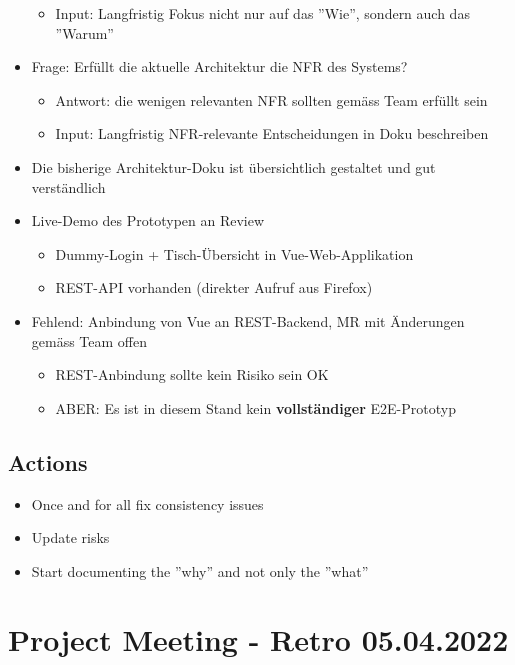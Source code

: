 \begin{itemize}
\begin{itemize}
        \item Input: Langfristig Fokus nicht nur auf das ''Wie'', sondern auch das ''Warum''
    \end{itemize}
    \item Frage: Erfüllt die aktuelle Architektur die NFR des Systems?
    \begin{itemize}
        \item Antwort: die wenigen relevanten NFR sollten gemäss Team erfüllt sein
        \item Input: Langfristig NFR-relevante Entscheidungen in Doku beschreiben
    \end{itemize}
    \item Die bisherige Architektur-Doku ist übersichtlich gestaltet und gut verständlich
    \item Live-Demo des Prototypen an Review
    \begin{itemize}
        \item Dummy-Login + Tisch-Übersicht in Vue-Web-Applikation
        \item REST-API vorhanden (direkter Aufruf aus Firefox)
    \end{itemize}
    \item Fehlend: Anbindung von Vue an REST-Backend, MR mit Änderungen gemäss Team offen
    \begin{itemize}
        \item REST-Anbindung sollte kein Risiko sein \textrightarrow OK
        \item ABER: Es ist in diesem Stand kein \textbf{vollständiger} E2E-Prototyp
    \end{itemize}
\end{itemize}

\subsection{Actions}

\begin{itemize}
    \item Once and for all fix consistency issues
    \item Update risks
    \item Start documenting the ''why'' and not only the ''what''
\end{itemize}


\section{Project Meeting - Retro 05.04.2022}

